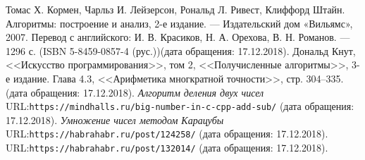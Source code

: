 \documentclass[pdf, unicode, 12pt, a4paper,oneside,fleqn]{article}
\begin{document}
\pagebreak


\begin{thebibliography}{5}
Томас Х. Кормен, Чарльз И. Лейзерсон, Рональд Л. Ривест, Клиффорд Штайн. Алгоритмы: построение и анализ, 2-е издание. — Издательский дом «Вильямс», 2007. Перевод с английского: И. В. Красиков, Н. А. Орехова, В. Н. Романов. — 1296 с. (ISBN 5-8459-0857-4 (рус.))(дата обращения: 17.12.2018).
Дональд Кнут, <<Искусство программирования>>, том 2, <<Получисленные алгоритмы>>, 3-е издание. Глава 4.3,
<<Арифметика многкратной точности>>, стр. 304–335.(дата обращения: 17.12.2018).
{\itshape Алгоритм деления двух чисел} \\URL:\texttt{https://mindhalls.ru/big-number-in-c-cpp-add-sub/} (дата обращения: 17.12.2018). 
{\itshape Умножение чисел методом Карацубы} \\URL:\texttt{https://habrahabr.ru/post/124258/} (дата обращения: 17.12.2018).
 \\URL:\texttt{https://habrahabr.ru/post/132014/} (дата обращения: 17.12.2018).
\end{thebibliography}
\pagebreak
\end{document}
